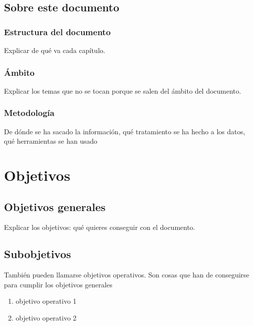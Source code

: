 \documentclass[a4paper, 12pt]{book}
\begin{document}

\section{Sobre este documento}
\label{sec:about}

\subsection{Estructura del documento}

Explicar de qué va cada capítulo.

\subsection{Ámbito}
\label{subsec:scope}
Explicar los temas que no se tocan porque se salen del ámbito del documento.

\subsection{Metodología}
\label{subsec:methodology}
De dónde se ha sacado la información, qué tratamiento se ha hecho a los datos,
qué herramientas se han usado

\chapter{Objetivos}
\label{chap:Goals} 
\section{Objetivos generales}

Explicar los objetivos: qué quieres conseguir con el documento.

\section{Subobjetivos}
También pueden llamarse objetivos operativos. Son cosas que han de conseguirse
para cumplir los objetivos generales

\begin{enumerate}
 \item objetivo operativo 1

 \item objetivo operativo 2

\end{enumerate}
\end{document}
